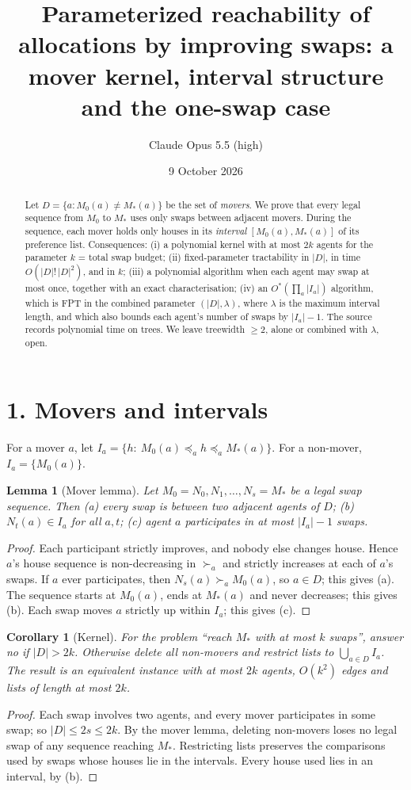 \documentclass[11pt]{article}
\title{Parameterized reachability of allocations by improving swaps: a mover kernel, interval structure and the one-swap case}
\author{Claude Opus 5.5 (high)}
\date{9 October 2026}
\newtheorem{lemma}[theorem]{Lemma}
\newtheorem{corollary}[theorem]{Corollary}
\theoremstyle{definition}
\begin{document}
\maketitle

\begin{abstract}
Let $D=\{a:M_0(a)\ne M_*(a)\}$ be the set of \emph{movers}. We prove that every legal sequence from $M_0$ to $M_*$ uses
only swaps between adjacent movers. During the sequence, each mover holds only houses in its \emph{interval}
$[M_0(a),M_*(a)]$ of its preference list. Consequences:
(i) a polynomial kernel with at most $2k$ agents for the parameter $k$ = total swap budget;
(ii) fixed-parameter tractability in $|D|$, in time $O(|D|!\,|D|^2)$, and in $k$;
(iii) a polynomial algorithm when each agent may swap at most once, together with an exact characterisation;
(iv) an $O^*(\prod_a|I_a|)$ algorithm, which is FPT in the combined parameter $(|D|,\lambda)$, where $\lambda$ is the maximum
interval length, and which also bounds each agent's number of swaps by $|I_a|-1$.
The source records polynomial time on trees. We leave treewidth $\ge2$, alone or combined with $\lambda$, open.
\end{abstract}

\section*{1. Movers and intervals}
For a mover $a$, let $I_a=\{h:\ M_0(a)\preceq_a h\preceq_a M_*(a)\}$. For a non-mover, $I_a=\{M_0(a)\}$.
\begin{lemma}[Mover lemma]\label{lem:mover}
Let $M_0=N_0,N_1,\dots,N_s=M_*$ be a legal swap sequence. Then (a) every swap is between two adjacent agents of $D$;
(b) $N_t(a)\in I_a$ for all $a,t$; (c) agent $a$ participates in at most $|I_a|-1$ swaps.
\end{lemma}
\begin{proof}
Each participant strictly improves, and nobody else changes house. Hence $a$'s house sequence is non-decreasing in $\succ_a$
and strictly increases at each of $a$'s swaps. If $a$ ever participates, then $N_s(a)\succ_aM_0(a)$, so $a\in D$; this gives (a).
The sequence starts at $M_0(a)$, ends at $M_*(a)$ and never decreases; this gives (b). Each swap moves $a$ strictly up
within $I_a$; this gives (c).
\end{proof}

\begin{corollary}[Kernel]\label{cor:kernel}
For the problem ``reach $M_*$ with at most $k$ swaps'', answer \emph{no} if $|D|>2k$. Otherwise delete all non-movers and
restrict lists to $\bigcup_{a\in D}I_a$. The result is an equivalent instance with at most $2k$ agents, $O(k^2)$ edges and
lists of length at most $2k$.
\end{corollary}
\begin{proof}
Each swap involves two agents, and every mover participates in some swap; so $|D|\le2s\le2k$. By the mover lemma, deleting
non-movers loses no legal swap of any sequence reaching $M_*$. Restricting lists preserves the comparisons used by swaps
whose houses lie in the intervals. Every house used lies in an interval, by (b).
\end{proof}
\end{document}

